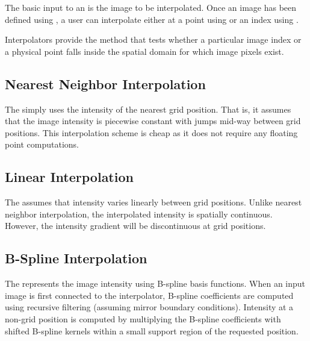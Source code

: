 
The basic input to an  is the image to
be interpolated. Once an image has been defined using ,
a user can interpolate either at a point using  or
an index using .
 
Interpolators provide the method  that tests whether a
particular image index or a physical point falls inside the spatial domain for
which image pixels exist.

\subsection{Nearest Neighbor Interpolation}
\label{sec:NearestNeighborInterpolation}
The  simply uses the
intensity of the nearest grid position. That is, it assumes that the image
intensity is piecewise constant with jumps mid-way between grid positions.
This interpolation scheme is cheap as it does not require any floating point
computations.

\subsection{Linear Interpolation}
\label{sec:LinearInterpolation}

The  assumes that intensity varies
linearly between grid positions. Unlike nearest neighbor interpolation, the
interpolated intensity is spatially continuous. However, the intensity
gradient will be discontinuous at grid positions.

\subsection{B-Spline Interpolation}
\label{sec:BSplineInterpolation}

The  represents the image intensity
using B-spline basis functions. When an input image is first connected to the
interpolator, B-spline coefficients are computed using recursive filtering
(assuming mirror boundary conditions). Intensity at a non-grid position is
computed by multiplying the B-spline coefficients with shifted B-spline
kernels within a small support region of the requested position.

